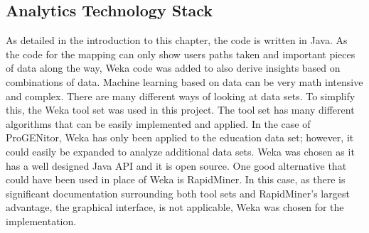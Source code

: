 \subsection{Analytics Technology Stack}
As detailed in the introduction to this chapter, the code is written in Java. 
As the code for the mapping can only show users paths taken and important pieces
of data along the way, Weka code was added to also derive insights based on
combinations of data.  Machine learning based on data can be very math intensive
and complex.  There are many different ways of looking at data sets.  To
simplify this, the Weka tool set was used in this project.  The tool set has
many different algorithms that can be easily implemented and applied.  In the case of
ProGENitor, Weka has only been applied to the education data set; however, it
could easily be expanded to analyze additional data sets.  Weka was chosen as it
has a well designed Java API and it is open source.  One good alternative
that could have been used in place of Weka is RapidMiner.  In this case, as
there is significant documentation surrounding both tool sets and RapidMiner's
largest advantage, the graphical interface, is not applicable, Weka was chosen
for the implementation.
